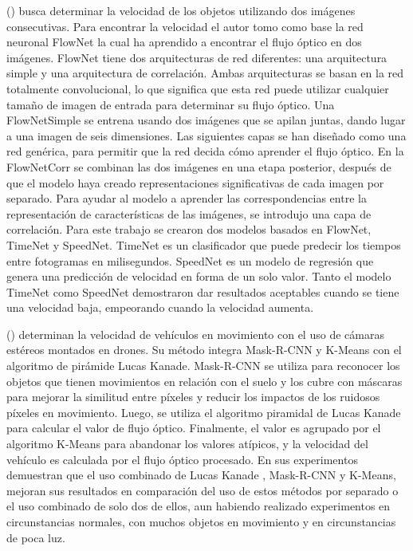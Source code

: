 \citeauthor{loor2017Visual} (\cite{loor2017Visual}) busca determinar la velocidad de los objetos utilizando dos imágenes consecutivas. Para encontrar la velocidad el autor tomo como base la red neuronal FlowNet la cual ha aprendido a encontrar el flujo óptico en dos imágenes. FlowNet tiene dos arquitecturas de red diferentes: una arquitectura simple y una arquitectura de correlación. Ambas arquitecturas se basan en la red totalmente convolucional, lo que significa que esta red puede utilizar cualquier tamaño de imagen de entrada para determinar su flujo óptico. Una FlowNetSimple se entrena usando dos imágenes que se apilan juntas, dando lugar a una imagen de seis dimensiones. Las siguientes capas se han diseñado como una red genérica, para permitir que la red decida cómo aprender el flujo óptico. En la FlowNetCorr se combinan las dos imágenes en una etapa posterior, después de que el modelo haya creado representaciones significativas de cada imagen por separado. Para ayudar al modelo a aprender las correspondencias entre la representación de características de las imágenes, se introdujo una capa de correlación. Para este trabajo se crearon dos modelos basados en FlowNet, TimeNet y SpeedNet. TimeNet es un clasificador que puede predecir los tiempos entre fotogramas en milisegundos. SpeedNet es un modelo de regresión que genera una predicción de velocidad en forma de un solo valor. Tanto el modelo TimeNet como SpeedNet demostraron dar resultados aceptables cuando se tiene una velocidad baja, empeorando cuando la velocidad aumenta. 

\citeauthor{peng2019Improved} (\cite{peng2019Improved}) determinan la velocidad de vehículos en movimiento con el uso de cámaras estéreos montados en drones. Su método integra Mask-R-CNN y K-Means con el algoritmo de pirámide Lucas Kanade. Mask-R-CNN se utiliza para reconocer los objetos que tienen movimientos en relación con el suelo y los cubre con máscaras para mejorar la similitud entre píxeles y reducir los impactos de los ruidosos píxeles en movimiento. Luego, se utiliza el algoritmo piramidal de Lucas Kanade para calcular el valor de flujo óptico. Finalmente, el valor es agrupado por el algoritmo K-Means para abandonar los valores atípicos, y la velocidad del vehículo es calculada por el flujo óptico procesado. En sus experimentos demuestran que el uso combinado de Lucas Kanade , Mask-R-CNN y K-Means, mejoran sus resultados en comparación del uso de estos métodos por separado o el uso combinado de solo dos de ellos, aun habiendo realizado experimentos en circunstancias normales, con muchos objetos en movimiento y en circunstancias de poca luz. 


